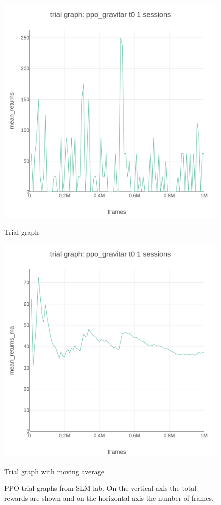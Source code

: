 \documentclass[12pt,a4paper]{report}
\begin{document}
	\begin{figure}[ht!]
		\begin{minipage}[c]{0.5\linewidth}
			\centering
			\includegraphics[height=0.3\textheight, width=0.9\linewidth]{ppo_gravitar_t0_trial_graph_mean_returns_vs_frames.png}
			\caption{Trial graph}
		\end{minipage}\hfill
		\begin{minipage}[c]{0.5\linewidth}	
			\centering
			\includegraphics[height=0.3\textheight, width=0.9\linewidth]{ppo_gravitar_t0_trial_graph_mean_returns_ma_vs_frames.png}
			\caption{Trial graph with moving average}
		\end{minipage}
		\caption{PPO trial graphs from SLM lab. On the vertical axis the total rewards are shown and on the horizontal axis the number of frames.}
	\end{figure}
\end{document}
